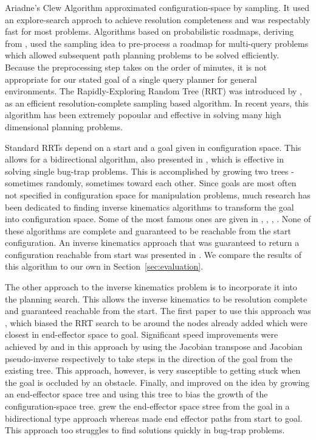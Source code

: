\documentclass[conference]{IEEEtran}
\begin{document}
Ariadne's Clew Algorithm \cite{bessiere93} approximated configuration-space by sampling. It used an explore-search approch to achieve
resolution completeness and was respectably fast for most problems. Algorithms based on probabilistic roadmaps, deriving from
\cite{amato96}, used the sampling idea to pre-process a roadmap for multi-query problems which allowed subsequent path planning problems to
be solved efficiently. Because the preprocessing step takes on the order of minutes, it is not appropriate for our stated goal of a single
query planner for general environments. The Rapidly-Exploring Random Tree (RRT) was introduced by \cite{lavalle00}, \cite{lavalle98} as an
efficient resolution-complete sampling based algorithm. In recent years, this algorithm has been extremely popoular and effective in solving
many high dimensional planning problems.

Standard RRTs depend on a start and a goal given in configuration space. This allows for a bidirectional algorithm, also presented in
\cite{lavalle00}, which is effective in solving single bug-trap problems. This is accomplished by growing two trees - sometimes randomly,
sometimes toward each other. Since goals are most often not specified in configuration space for manipulation problems, much research has
been dedicated to finding inverse kinematics algorithms to transform the goal into configuration space. Some of the most famous ones are
given in \cite{goldenberg85}, \cite{guez88}, \cite{chang87}, \cite{parker89}. None of these algorithms are complete and guaranteed to be
reachable from the start configuration. An inverse kinematics approach that was guaranteed to return a configuration reachable from start
was presented in \cite{ahuactzin99}. We compare the results of this algorithm to our own in Section~\ref{sec:evaluation}. 

The other approach to the inverse kinematics problem is to incorporate it into the planning search. This allows the inverse kinematics to be
resolution complete and guaranteed reachable from the start. The first paper to use this approach was \cite{bertram06}, which biased the RRT
search to be around the nodes already added which were closest in end-effector space to goal. Significant speed improvements were achieved
by \cite{vande07} and \cite{vahrenkamp09} in this approach by using the Jacobian transpose and Jacobian pseudo-inverse respectively to take
steps in the direction of the goal from the existing tree. This approach, however, is very susceptible to getting stuck when the goal is
occluded by an obstacle. Finally, \cite{diankov08} and \cite{yao05} improved on the idea by growing an end-effector space tree and using
this tree to bias the growth of the configuration-space tree.  \cite{diankov08} grew the end-effector space stree from the goal in a
bidirectional type approach whereas \cite{yao05} made end effector paths from start to goal. This approach too struggles to find solutions
quickly in bug-trap problems.
 
\end{document}
